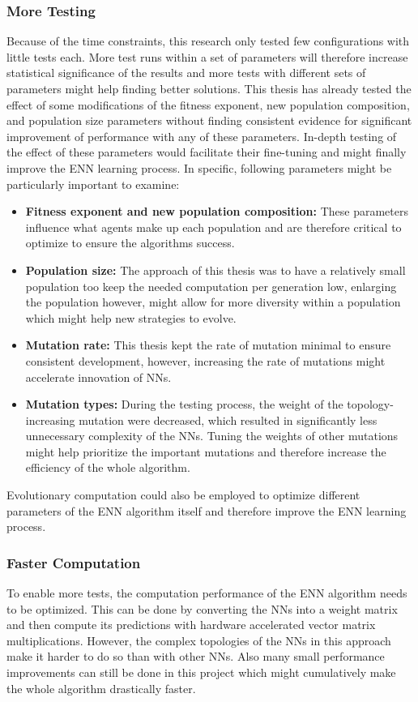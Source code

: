 \documentclass[11pt]{report}
\begin{document}
\begin{enumerate}
    \subsubsection{More Testing}
    Because of the time constraints, this research only tested few configurations with little tests each.
    More test runs within a set of parameters will therefore increase statistical significance of the results and more tests with different sets of parameters might help finding better solutions.
    This thesis has already tested the effect of some modifications of the fitness exponent, new population composition, and population size parameters without finding consistent evidence for significant improvement of performance with any of these parameters.
    In-depth testing of the effect of these parameters would facilitate their fine-tuning and might finally improve the ENN learning process.
    In specific, following parameters might be particularly important to examine:
    \begin{itemize}
        \item \textbf{Fitness exponent and new population composition:} These parameters influence what agents make up each population and are therefore critical to optimize to ensure the algorithms success.
        \item \textbf{Population size:} The approach of this thesis was to have a relatively small population too keep the needed computation per generation low, enlarging the population however, might allow for more diversity within a population which might help new strategies to evolve.
        \item \textbf{Mutation rate:} This thesis kept the rate of mutation minimal to ensure consistent development, however, increasing the rate of mutations might accelerate innovation of NNs.
        \item \textbf{Mutation types:} During the testing process, the weight of the topology-increasing mutation were decreased, which resulted in significantly less unnecessary complexity of the NNs.
        Tuning the weights of other mutations might help prioritize the important mutations and therefore increase the efficiency of the whole algorithm.
    \end{itemize}
    Evolutionary computation could also be employed to optimize different parameters of the ENN algorithm itself and therefore improve the ENN learning process.

    \subsubsection{Faster Computation}
    To enable more tests, the computation performance of the ENN algorithm needs to be optimized.
    This can be done by converting the NNs into a weight matrix and then compute its predictions with hardware accelerated vector matrix multiplications.
    However, the complex topologies of the NNs in this approach make it harder to do so than with other NNs.
    Also many small performance improvements can still be done in this project which might cumulatively make the whole algorithm drastically faster.


\end{enumerate}
\end{document}

